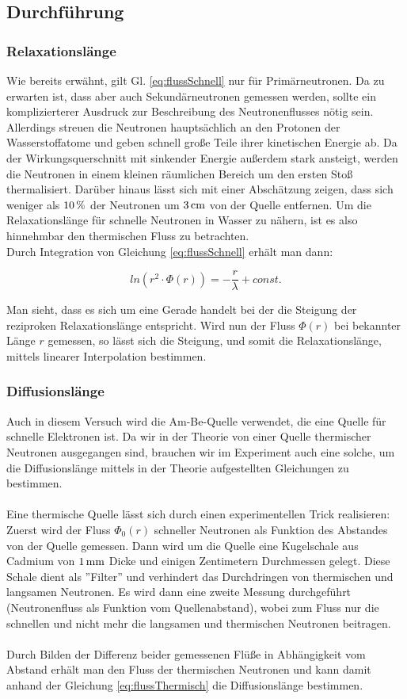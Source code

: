 \documentclass[a4paper,titlepage]{scrartcl}
\numberwithin{equation}{section}
\begin{document}
\subsection{Durchführung}
\subsubsection{Relaxationslänge}
Wie bereits erwähnt, gilt Gl. \ref{eq:flussSchnell} nur für Primärneutronen. Da zu erwarten ist, dass aber auch Sekundärneutronen gemessen werden, sollte ein komplizierterer Ausdruck zur Beschreibung des Neutronenflusses nötig sein. Allerdings streuen die Neutronen hauptsächlich an den Protonen der Wasserstoffatome und geben schnell große Teile ihrer kinetischen Energie ab. Da der Wirkungsquerschnitt mit sinkender Energie außerdem stark ansteigt, werden die Neutronen in einem kleinen räumlichen Bereich um den ersten Stoß thermalisiert. Darüber hinaus lässt sich mit einer Abschätzung zeigen, dass sich weniger als $\unit[10]{\%}$ der Neutronen um $\unit[3]{cm}$ von der Quelle entfernen. Um die Relaxationslänge für schnelle Neutronen in Wasser zu nähern, ist es also hinnehmbar den thermischen Fluss zu betrachten.\\
Durch Integration von Gleichung \ref{eq:flussSchnell} erhält man dann:

\begin{equation}
ln(r^2 \cdot \Phi (r))= - \frac{r}{\lambda} + const.
\end{equation}

Man sieht, dass es sich um eine Gerade handelt bei der die Steigung der reziproken Relaxationslänge entspricht. Wird nun der Fluss $\Phi(r)$ bei bekannter Länge $r$ gemessen, so lässt sich die Steigung, und somit die Relaxationslänge, mittels linearer Interpolation bestimmen.
\subsubsection{Diffusionslänge}
Auch in diesem Versuch wird die Am-Be-Quelle verwendet, die eine Quelle für schnelle Elektronen ist. Da wir in der Theorie von einer Quelle thermischer Neutronen ausgegangen sind, brauchen wir im Experiment auch eine solche, um die Diffusionslänge mittels in der Theorie aufgestellten Gleichungen zu bestimmen.\\ \\
Eine thermische Quelle lässt sich durch einen experimentellen Trick realisieren:
Zuerst wird der Fluss $\Phi_0(r)$ schneller Neutronen als Funktion des Abstandes von der Quelle gemessen. Dann wird um die Quelle eine Kugelschale aus Cadmium von $\unit[1]{mm}$ Dicke und einigen Zentimetern Durchmessen gelegt. Diese Schale dient als ''Filter'' und verhindert das Durchdringen von thermischen und langsamen Neutronen. Es wird dann eine zweite Messung durchgeführt (Neutronenfluss als Funktion vom Quellenabstand), wobei zum Fluss nur die schnellen und nicht mehr die langsamen und thermischen Neutronen beitragen.\\ \\
Durch Bilden der Differenz beider gemessenen Flüße in Abhängigkeit vom Abstand erhält man den Fluss der thermischen Neutronen und kann damit anhand der Gleichung \ref{eq:flussThermisch} die Diffusionslänge bestimmen.
\end{document}
